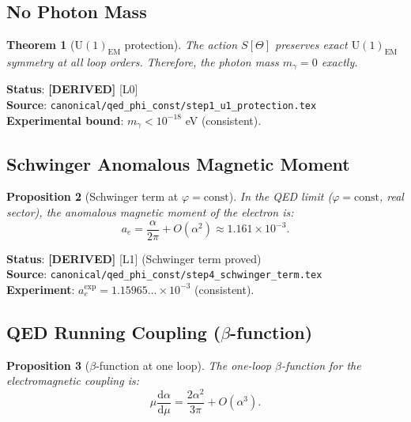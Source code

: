 \documentclass[11pt,a4paper]{article}
\newtheorem{theorem}{Theorem}[section]
\newtheorem{proposition}[theorem]{Proposition}
\theoremstyle{definition}
\theoremstyle{remark}
\begin{document}
\subsection{No Photon Mass}

\begin{theorem}[$\mathrm{U}(1)_{\mathrm{EM}}$ protection]\label{thm:no_mass}
The action $S[\Theta]$ preserves exact $\mathrm{U}(1)_{\mathrm{EM}}$ symmetry
at all loop orders.  Therefore, the photon mass $m_\gamma = 0$ exactly.
\end{theorem}

\noindent\textbf{Status}: \textbf{[DERIVED]} [L0] \\
\noindent\textbf{Source}: \texttt{canonical/qed\_phi\_const/step1\_u1\_protection.tex} \\
\noindent\textbf{Experimental bound}: $m_\gamma < 10^{-18}$ eV (consistent).

\subsection{Schwinger Anomalous Magnetic Moment}

\begin{proposition}[Schwinger term at $\varphi = \mathrm{const}$]
\label{prop:schwinger}
In the QED limit ($\varphi = \mathrm{const}$, real sector), the anomalous
magnetic moment of the electron is:
\begin{equation}\label{eq:schwinger}
  a_e = \frac{\alpha}{2\pi} + O(\alpha^2)
  \approx 1.161 \times 10^{-3}.
\end{equation}
\end{proposition}

\noindent\textbf{Status}: \textbf{[DERIVED]} [L1] (Schwinger term proved) \\
\noindent\textbf{Source}: \texttt{canonical/qed\_phi\_const/step4\_schwinger\_term.tex} \\
\noindent\textbf{Experiment}: $a_e^{\mathrm{exp}} = 1.15965\ldots \times 10^{-3}$ (consistent).

\subsection{QED Running Coupling ($\beta$-function)}

\begin{proposition}[$\beta$-function at one loop]
\label{prop:beta}
The one-loop $\beta$-function for the electromagnetic coupling is:
\begin{equation}\label{eq:beta}
  \mu\frac{\mathrm{d}\alpha}{\mathrm{d}\mu}
  = \frac{2\alpha^2}{3\pi} + O(\alpha^3).
\end{equation}
\end{proposition}
\end{document}

